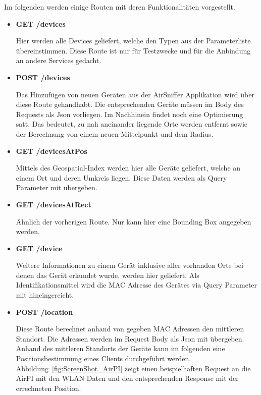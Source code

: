 \documentclass[11pt,a4paper]{article}
\begin{document}
\newpage
\noindent
Im folgenden werden einige Routen mit deren Funktionalitäten vorgestellt.

\begin{itemize}
\item{} \textbf{GET /devices}

Hier werden alle Devices geliefert, welche den Typen aus der Parameterliste übereinstimmen. Diese Route ist nur für Testzwecke und für die Anbindung an andere Services gedacht. 

\item{} \textbf{POST /devices}

Das Hinzufügen von neuen Geräten aus der AirSniffer Applikation wird über diese Route gehandhabt. Die entsprechenden Geräte müssen im Body des Requests als Json vorliegen. Im Nachhinein findet noch eine Optimierung satt. Das bedeutet, zu nah aneinander liegende Orte werden entfernt sowie der Berechnung von einem neuen Mittelpunkt und dem Radius.

\item{} \textbf{GET /devicesAtPos}

Mittels des Geospatial-Index werden hier alle Geräte geliefert, welche an einem Ort und deren Umkreis liegen. Diese Daten werden als Query Parameter mit übergeben.

\item{} \textbf{GET /devicesAtRect}

Ähnlich der vorherigen Route. Nur kann hier eine Bounding Box angegeben werden.

\item{} \textbf{GET /device}

Weitere Informationen zu einem Gerät inklusive aller vorhanden Orte bei denen das Gerät erkundet wurde, werden hier geliefert. Als Identifikationsmittel wird die MAC Adresse des Gerätes via Query Parameter mit hineingereicht.

\item{} \textbf{POST /location}

Diese Route berechnet anhand von gegeben MAC Adressen den mittleren Standort. Die Adressen werden im Request Body als Json mit übergeben. Anhand des mittleren Standorts der Geräte kann im folgenden eine Positionsbestimmung eines Clients durchgeführt werden. Abbildung~\ref{fig:ScreenShot_AirPI} zeigt einen beispielhaften Request an die AirPI mit den WLAN Daten und den entsprechenden Response mit der errechneten Position.

\end{itemize}
\end{document}
